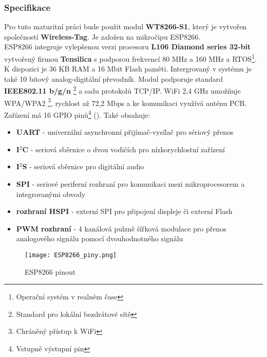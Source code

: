 \documentclass[a4paper, 12pt]{report}
\begin{document}
				\subsubsection{Specifikace}
					Pro tuto maturitní práci bude použit modul \textbf{WT8266-S1}, který je vytvořen společností \textbf{Wireless-Tag}. Je založen na mikročipu ESP8266.\\
					ESP8266 integruje vylepšenou verzi procesoru \textbf{L106 Diamond series 32-bit} vytvořený firmou \textbf{Tensilica} s podporou frekvencí 80 \si{MHz} a 160 \si{MHz} a RTOS\footnote{Operační systém v realném čase}.
					K dispozici je 36 \si{KB} RAM a 16 \si{Mbit} Flash paměti. Intergrovaný v systému je také 10 bitový analog-digitální převodník. Modul podporuje standard {\bf IEEE802.11 b/g/n}	\footnote{Standard pro lokální bezdrátové sítě} a sadu protokolů TCP/IP. WiFi 2,4 \si{GHz} umožňuje WPA/WPA2 \footnote{Chráněný přístup k WiFi}, rychlost až 72,2 \si{Mbps} a ke komunikaci využívá anténu PCB. Zařízení má 16 GPIO pinů\footnote{Vstupně výstupní pin} (). Také obsahuje:
					\begin{itemize}
						\item {\bf UART} - univerzální asynchronní přijímač-vysílač pro sériový přenos
						\item {\bf I$^2$C} - seriová sběrnice o dvou vodičích pro nízkorychlostní zařízení
						\item {\bf I$^2$S} - seriová sběrnice pro digitální audio
						\item {\bf SPI} - seriové periferní rozhraní pro komunikaci mezi mikroprocesorem a integrovanými obvody
						\item {\bf rozhraní HSPI} - externí SPI pro připojení displeje či externí Flash
						\item {\bf PWM rozhraní} - 4 kanálová pulzně šířková modulace pro přenos analogového signálu pomocí dvouhodnotného signálu
					\end{itemize}

					\begin{figure}[h]
						\centering
						\texttt{[image: ESP8266\_piny.png]}
						\caption{ESP8266 pinout}
						\label{ESP8266_piny}
					\end{figure}
\end{document}
